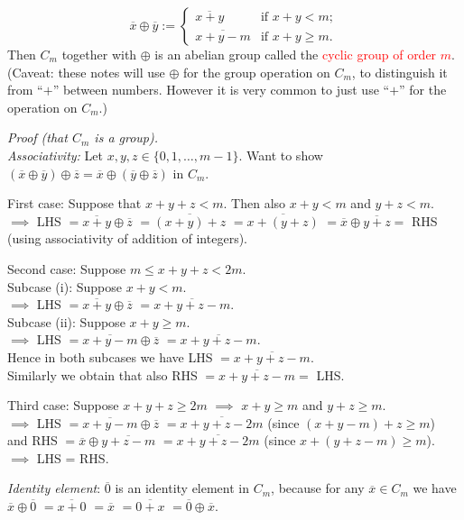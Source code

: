 \documentclass[
  12pt,
  a4paper,
  twoside]{article}
\theoremstyle{plain}
\theoremstyle{definition}
\begin{document}
\begin{enumerate}
  \[
  \overline{x} \oplus \overline{y} :=
  \begin{cases}
  \overline{x+y} & \text{if }x+y<m;\\
  \overline{x+y-m} & \text{if }x+y\geq m.
  \end{cases}
  \]
  Then \(C_m\) together with \(\oplus\) is an abelian group called the \textcolor{red}{cyclic group of order $m$}. (Caveat: these notes will use \(\oplus\) for the group operation on \(C_m\), to distinguish it from ``\(+\)'' between numbers. However it is very common to just use ``\(+\)'' for the operation on \(C_m\).)
\end{enumerate}

\emph{Proof (that \(C_m\) is a group).}\\
\emph{Associativity:} Let \(x,y,z\in \{0,1,\dots,m-1\}\). Want to show \((\overline{x}\oplus\overline{y})\oplus\overline{z} = \overline{x} \oplus(\overline{y}\oplus\overline{z})\) in \(C_m\).

First case: Suppose that \(x+y+z<m\). Then also \(x+y<m\) and \(y+z<m\).\\
\(\implies\) LHS \(=\overline{x+y}\oplus\overline{z}\) \(=\overline{(x+y)+z}\) \(=\overline{x+(y+z)}\) \(=\overline{x}\oplus\overline{y+z}=\) RHS (using associativity of addition of integers).

Second case: Suppose \(m\leq x+y+z<2m\).\\
Subcase (i): Suppose \(x+y<m\).\\
\(\implies\) LHS \(=\overline{x+y}\oplus \overline{z}\) \(= \overline{x+y+z-m}\).\\
Subcase (ii): Suppose \(x+y \geq m\).\\
\(\implies\) LHS \(=\overline{x+y-m}\oplus\overline{z}\) \(= \overline{x+y+z-m}\).\\
Hence in both subcases we have LHS \(=\overline{x+y+z-m}\).\\
Similarly we obtain that also RHS \(=\overline{x+y+z-m} =\) LHS.

Third case: Suppose \(x+y+z\geq 2m\) \(\implies\) \(x+y\geq m\) and \(y+z\geq m\).\\
\(\implies\) LHS \(=\overline{x+y-m}\oplus\overline{z}\) \(=\overline{x+y+z-2m}\) (since \((x+y-m)+z \geq m\))\\
and RHS \(=\overline{x}\oplus\overline{y+z-m}\) \(=\overline{x+y+z-2m}\) (since \(x+(y+z-m)\geq m\)).\\
\(\implies\) LHS = RHS.

\emph{Identity element}: \(\overline{0}\) is an identity element in \(C_m\), because for any \(\overline{x}\in C_m\) we have \(\overline{x}\oplus\overline{0}\) \(=\overline{x+0}\) \(=\overline{x}\) \(=\overline{0+x}\) \(=\overline{0}\oplus\overline{x}\).
\end{document}
